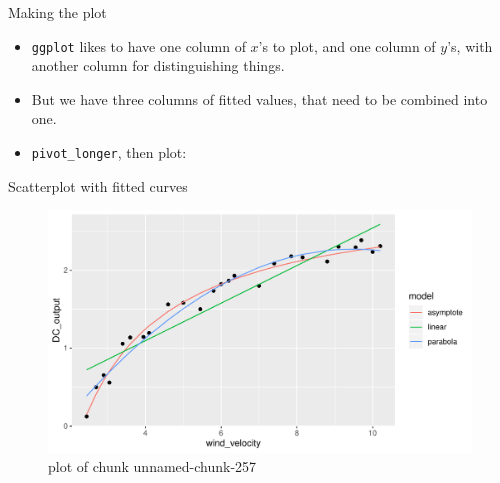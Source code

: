 \documentclass[
  ignorenonframetext,
]{beamer}
\newenvironment{Shaded}{\begin{snugshade}}{\end{snugshade}}
\newcommand{\DataTypeTok}[1]{\textcolor[rgb]{0.13,0.29,0.53}{#1}}
\newcommand{\KeywordTok}[1]{\textcolor[rgb]{0.13,0.29,0.53}{\textbf{#1}}}
\newcommand{\NormalTok}[1]{#1}
\newcommand{\OperatorTok}[1]{\textcolor[rgb]{0.81,0.36,0.00}{\textbf{#1}}}
\newcommand{\StringTok}[1]{\textcolor[rgb]{0.31,0.60,0.02}{#1}}
\providecommand{\tightlist}{%
  \setlength{\itemsep}{0pt}\setlength{\parskip}{0pt}}
\begin{document}
\begin{frame}[fragile]{Making the plot}
\protect\hypertarget{making-the-plot}{}

\begin{itemize}
\tightlist
\item
  \texttt{ggplot} likes to have one column of \(x\)'s to plot, and one
  column of \(y\)'s, with another column for distinguishing things.
\item
  But we have three columns of fitted values, that need to be combined
  into one.
\item
  \texttt{pivot\_longer}, then plot:
\end{itemize}

\begin{Shaded}
\end{Shaded}

\end{frame}

\begin{frame}{Scatterplot with fitted curves}
\protect\hypertarget{scatterplot-with-fitted-curves}{}

\begin{figure}
\centering
\includegraphics{figure/unnamed-chunk-257-1.pdf}
\caption{plot of chunk unnamed-chunk-257}
\end{figure}

\end{frame}
\end{document}
